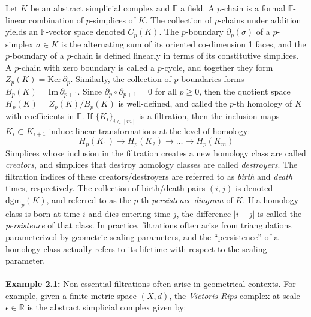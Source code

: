 \documentclass{siamart190516}
\begin{document}
Let $K$ be an abstract simplicial complex and $\mathbb{F}$ a field.
A $p$-chain is a
formal $\mathbb{F}$-linear combination  of $p$-simplices of $K$. The collection of $p$-chains under addition yields an 
$\mathbb{F}$-vector space  denoted   $C_p(K)$. 
The $p$-boundary $\partial_p(\sigma)$  of a $p$-simplex $\sigma\in K$ is the alternating sum of its oriented co-dimension 1 faces,
and the $p$-boundary of a $p$-chain is defined 
linearly in terms of its constitutive simplices. 
A $p$-chain with zero boundary is called a $p$-cycle, and together they form $Z_p(K) = \mathrm{Ker}\,\partial_p$. 
Similarly, the collection of $p$-boundaries forms  $B_p(K) = \mathrm{Im}\,\partial_{p+1}$.
Since $\partial_p \circ \partial_{p+1} = 0$ for all $p\geq 0$, 
then the quotient space $H_p(K) = Z_p(K) / B_{p}(K)$ is well-defined, and called the 
$p$-th homology of $K$ with coefficients in $\mathbb{F}$. 
If $\{K_i\}_{i\in [m]}$ is a filtration, then the inclusion maps  $K_i\subset K_{i+1}$   induce linear transformations 
at the level of homology:
\begin{equation}
	H_p(K_1) \to H_p(K_2) \to \dots \to H_p(K_m)
\end{equation}
Simplices whose inclusion in the filtration creates a new homology class are   called \emph{creators}, and simplices that destroy homology classes are   called \emph{destroyers}. 
The filtration indices of 
these creators/destroyers are referred to as \emph{birth} and \emph{death} times, respectively. 
The collection of birth/death  pairs 
$(i,j)$ is denoted $\mathrm{dgm}_p(K)$, 
and referred to as the $p$-th \emph{persistence diagram} of $K$.
If a homology class is born at time $i$ and dies entering time $j$, the difference $\lvert i - j \rvert$ is called the \emph{persistence} of that class.
In practice, filtrations often arise from triangulations parameterized by geometric scaling parameters, and the ``persistence'' of a homology class actually refers to its lifetime with respect to the scaling parameter. 
\\
\\
\noindent \textbf{Example 2.1:} Non-essential filtrations often arise in geometrical contexts. For example, given a finite metric space $(X, d)$, the \emph{Vietoris-Rips} complex at scale $\epsilon \in \mathbb{R}$ is the abstract simplicial complex given by: 
\end{document}
